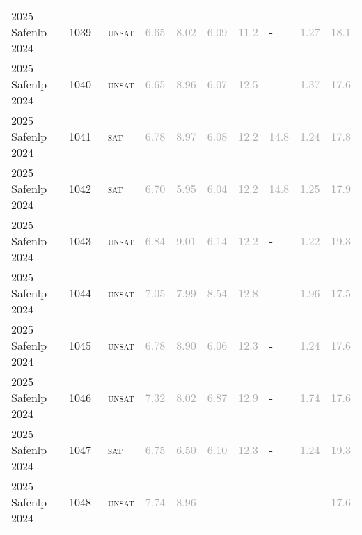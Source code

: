 \begin{center}
{\begin{longtable}{@{}llllllllll@{}}
2025 Safenlp 2024 & 1039 & ~\textsc{unsat} & \textcolor{darkgray}{6.65} & \textcolor{darkgray}{8.02} & \textcolor{darkgray}{6.09} & \textcolor{darkgray}{11.2} & - & \textcolor{darkgray}{1.27} & \textcolor{darkgray}{18.1} \\
2025 Safenlp 2024 & 1040 & ~\textsc{unsat} & \textcolor{darkgray}{6.65} & \textcolor{darkgray}{8.96} & \textcolor{darkgray}{6.07} & \textcolor{darkgray}{12.5} & - & \textcolor{darkgray}{1.37} & \textcolor{darkgray}{17.6} \\
2025 Safenlp 2024 & 1041 & ~\textsc{sat} & \textcolor{darkgray}{6.78} & \textcolor{darkgray}{8.97} & \textcolor{darkgray}{6.08} & \textcolor{darkgray}{12.2} & \textcolor{darkgray}{14.8} & \textcolor{darkgray}{1.24} & \textcolor{darkgray}{17.8} \\
2025 Safenlp 2024 & 1042 & ~\textsc{sat} & \textcolor{darkgray}{6.70} & \textcolor{darkgray}{5.95} & \textcolor{darkgray}{6.04} & \textcolor{darkgray}{12.2} & \textcolor{darkgray}{14.8} & \textcolor{darkgray}{1.25} & \textcolor{darkgray}{17.9} \\
2025 Safenlp 2024 & 1043 & ~\textsc{unsat} & \textcolor{darkgray}{6.84} & \textcolor{darkgray}{9.01} & \textcolor{darkgray}{6.14} & \textcolor{darkgray}{12.2} & - & \textcolor{darkgray}{1.22} & \textcolor{darkgray}{19.3} \\
2025 Safenlp 2024 & 1044 & ~\textsc{unsat} & \textcolor{darkgray}{7.05} & \textcolor{darkgray}{7.99} & \textcolor{darkgray}{8.54} & \textcolor{darkgray}{12.8} & - & \textcolor{darkgray}{1.96} & \textcolor{darkgray}{17.5} \\
2025 Safenlp 2024 & 1045 & ~\textsc{unsat} & \textcolor{darkgray}{6.78} & \textcolor{darkgray}{8.90} & \textcolor{darkgray}{6.06} & \textcolor{darkgray}{12.3} & - & \textcolor{darkgray}{1.24} & \textcolor{darkgray}{17.6} \\
2025 Safenlp 2024 & 1046 & ~\textsc{unsat} & \textcolor{darkgray}{7.32} & \textcolor{darkgray}{8.02} & \textcolor{darkgray}{6.87} & \textcolor{darkgray}{12.9} & - & \textcolor{darkgray}{1.74} & \textcolor{darkgray}{17.6} \\
2025 Safenlp 2024 & 1047 & ~\textsc{sat} & \textcolor{darkgray}{6.75} & \textcolor{darkgray}{6.50} & \textcolor{darkgray}{6.10} & \textcolor{darkgray}{12.3} & - & \textcolor{darkgray}{1.24} & \textcolor{darkgray}{19.3} \\
2025 Safenlp 2024 & 1048 & ~\textsc{unsat} & \textcolor{darkgray}{7.74} & \textcolor{darkgray}{8.96} & - & - & - & - & \textcolor{darkgray}{17.6} \\

\end{longtable}}
\end{center}
